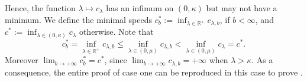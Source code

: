 \documentclass[11pt]{article}    %
\newtheorem{lemma}[theorem]{Lemma}
\newcommand{\R}{\mathbb{R}}
\renewcommand{\epsilon}{\varepsilon}
\newcommand{\eps}{\varepsilon}
\begin{document}
Hence, the function $\lambda \mapsto c_\lambda$ has an infimum on $(0,\kappa)$ but may not have a minimum. We define the minimal speeds $c^*_b := \inf_{\lambda\in\R^+} c_{\lambda,b}$, if $b < \infty$, and $c^* := \inf_{\lambda \in (0,\kappa)} c_\lambda$ otherwise. Note that
\begin{equation*}
c_{b}^* = \inf_{\lambda \in \R^+} c_{\lambda,b} \leq \inf_{\lambda \in (0,\mu)} c_{\lambda,b} < \inf_{\lambda \in (0,\mu)} c_{\lambda} = c^*. 
\end{equation*}
Moreover $\lim_{b \to +\infty} c_{b}^* = c^*$, since $\lim_{b \to +\infty} c_{\lambda,b} = + \infty$ when $\lambda > \kappa$. As a consequence, the entire proof of case one can be reproduced in this case to prove .
%
%
\end{document}
